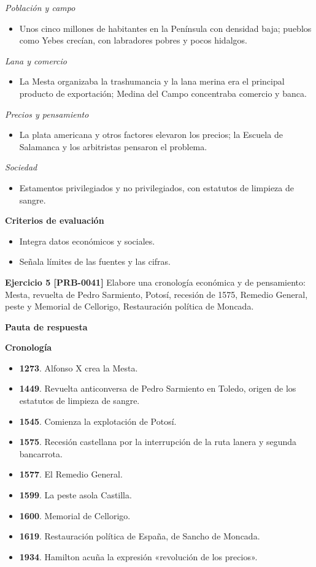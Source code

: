 \documentclass{book}
\begin{document}
\noindent\textit{Población y campo}
\begin{itemize}
\item Unos cinco millones de habitantes en la Península con densidad baja; pueblos como Yebes crecían, con labradores pobres y pocos hidalgos.
\end{itemize}

\noindent\textit{Lana y comercio}
\begin{itemize}
\item La Mesta organizaba la trashumancia y la lana merina era el principal producto de exportación; Medina del Campo concentraba comercio y banca.
\end{itemize}

\noindent\textit{Precios y pensamiento}
\begin{itemize}
\item La plata americana y otros factores elevaron los precios; la Escuela de Salamanca y los arbitristas pensaron el problema.
\end{itemize}

\noindent\textit{Sociedad}
\begin{itemize}
\item Estamentos privilegiados y no privilegiados, con estatutos de limpieza de sangre.
\end{itemize}

\noindent\textbf{Criterios de evaluación}
\begin{itemize}
\item Integra datos económicos y sociales.
\item Señala límites de las fuentes y las cifras.
\end{itemize}

\noindent\textbf{Ejercicio 5 [PRB-0041]}
Elabore una cronología económica y de pensamiento: Mesta, revuelta de Pedro Sarmiento, Potosí, recesión de 1575, Remedio General, peste y Memorial de Cellorigo, Restauración política de Moncada.


\noindent\textbf{Pauta de respuesta}

\noindent\textbf{Cronología}
\begin{itemize}
\item \textbf{1273}. Alfonso X crea la Mesta.
\item \textbf{1449}. Revuelta anticonversa de Pedro Sarmiento en Toledo, origen de los estatutos de limpieza de sangre.
\item \textbf{1545}. Comienza la explotación de Potosí.
\item \textbf{1575}. Recesión castellana por la interrupción de la ruta lanera y segunda bancarrota.
\item \textbf{1577}. El Remedio General.
\item \textbf{1599}. La peste asola Castilla.
\item \textbf{1600}. Memorial de Cellorigo.
\item \textbf{1619}. Restauración política de España, de Sancho de Moncada.
\item \textbf{1934}. Hamilton acuña la expresión «revolución de los precios».
\end{itemize}
\end{document}
